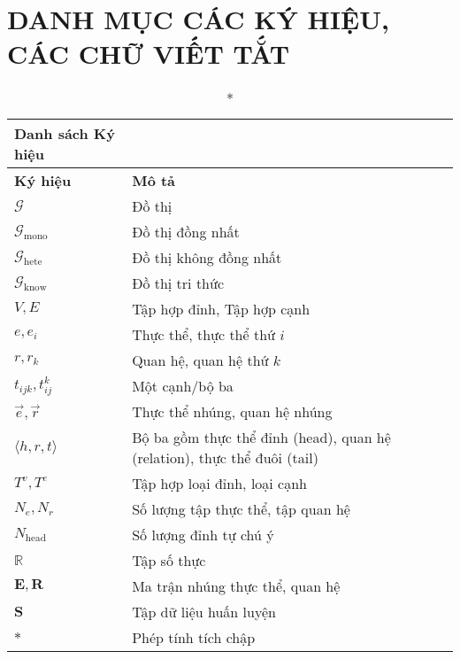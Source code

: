 \pagebreak
{}
{}
\section*{\textbf{ \Large DANH MỤC CÁC KÝ HIỆU, CÁC CHỮ VIẾT TẮT}}


%
%

\begin{center}
	\begin{longtable}{|p{2cm}|p{14cm}|}
		\caption*{Danh sách Ký hiệu} \\
		\hline
		\textbf{Ký hiệu} & \textbf{Mô tả} \\
		\hline
		$\mathcal{G}$ & Đồ thị \\
		\hline
		$\mathcal{G}_{\text{mono}}$ & Đồ thị đồng nhất \\
		\hline
		$\mathcal{G}_{\text{hete}}$ & Đồ thị không đồng nhất \\
		\hline
		$\mathcal{G}_{\text{know}}$ & Đồ thị tri thức \\
		\hline
		$V, E$ & Tập hợp đỉnh, Tập hợp cạnh \\
		\hline
		$e, e_i$ & Thực thể, thực thể thứ $i$ \\
		\hline
		$r, r_k$ & Quan hệ, quan hệ thứ $k$ \\
		\hline
		$t_{ijk}, t_{ij}^k$ & Một cạnh/bộ ba \\
		\hline
		$\overrightarrow{e}, \overrightarrow{r}$ & Thực thể nhúng, quan hệ nhúng \\
		\hline
		$\langle h, r, t \rangle$ & Bộ ba gồm thực thể đỉnh (head), quan hệ (relation), thực thể đuôi (tail) \\
		\hline
		$T^v, T^e$ & Tập hợp loại đỉnh, loại cạnh \\
		\hline
		$N_e, N_r$ & Số lượng tập thực thể, tập quan hệ \\
		\hline
		$N_{\text{head}}$ & Số lượng đỉnh tự chú ý \\
		\hline
		$\mathbb{R}$ & Tập số thực \\
		\hline
		$\mathbf{E}, \mathbf{R}$ & Ma trận nhúng thực thể, quan hệ \\
		\hline
		$\mathbf{S}$ & Tập dữ liệu huấn luyện \\
		\hline
		$\ast$ & Phép tính tích chập \\

\end{longtable}
\end{center}
